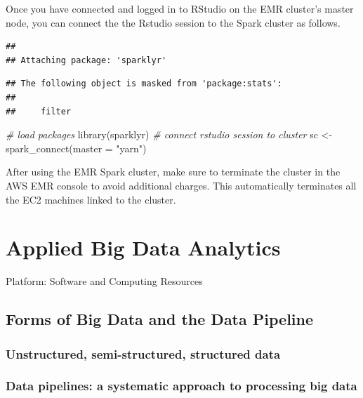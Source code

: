 \documentclass[
  12pt,
]{style/krantz}
\newenvironment{Shaded}{\begin{snugshade}}{\end{snugshade}}
\newcommand{\AttributeTok}[1]{\textcolor[rgb]{0.77,0.63,0.00}{#1}}
\newcommand{\CommentTok}[1]{\textcolor[rgb]{0.56,0.35,0.01}{\textit{#1}}}
\newcommand{\FunctionTok}[1]{\textcolor[rgb]{0.00,0.00,0.00}{#1}}
\newcommand{\NormalTok}[1]{#1}
\newcommand{\OtherTok}[1]{\textcolor[rgb]{0.56,0.35,0.01}{#1}}
\newcommand{\StringTok}[1]{\textcolor[rgb]{0.31,0.60,0.02}{#1}}
\begin{document}
Once you have connected and logged in to RStudio on the EMR cluster's master node, you can connect the the Rstudio session to the Spark cluster as follows.

\begin{verbatim}
## 
## Attaching package: 'sparklyr'
\end{verbatim}

\begin{verbatim}
## The following object is masked from 'package:stats':
## 
##     filter
\end{verbatim}

\begin{Shaded}
\begin{Highlighting}[]
\CommentTok{\# load packages}
\FunctionTok{library}\NormalTok{(sparklyr)}
\CommentTok{\# connect rstudio session to cluster}
\NormalTok{sc }\OtherTok{\textless{}{-}} \FunctionTok{spark\_connect}\NormalTok{(}\AttributeTok{master =} \StringTok{"yarn"}\NormalTok{)}
\end{Highlighting}
\end{Shaded}

After using the EMR Spark cluster, make sure to terminate the cluster in the AWS EMR console to avoid additional charges. This automatically terminates all the EC2 machines linked to the cluster.

\hypertarget{part-applied-big-data-analytics}{%
\part{Applied Big Data Analytics}\label{part-applied-big-data-analytics}}

Platform: Software and Computing Resources

\hypertarget{forms-of-big-data-and-the-data-pipeline}{%
\chapter{Forms of Big Data and the Data Pipeline}\label{forms-of-big-data-and-the-data-pipeline}}

\hypertarget{unstructured-semi-structured-structured-data}{%
\section{Unstructured, semi-structured, structured data}\label{unstructured-semi-structured-structured-data}}

\hypertarget{data-pipelines-a-systematic-approach-to-processing-big-data}{%
\section{Data pipelines: a systematic approach to processing big data}\label{data-pipelines-a-systematic-approach-to-processing-big-data}}
\end{document}
